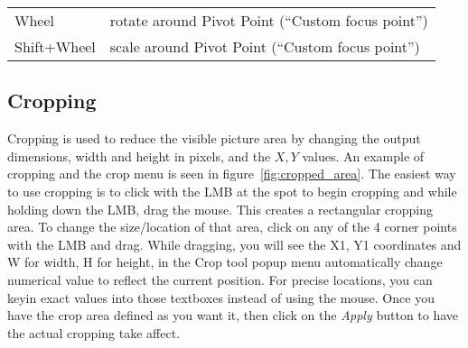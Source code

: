 \vspace{2ex}
\begin{tabular}{ll}
    \hline			
    Wheel & rotate around Pivot Point (“Custom focus point”) \\
    Shift+Wheel & scale around Pivot Point (“Custom focus point”) \\       
    \hline  
\end{tabular}

\vspace{2ex}

\subsection{Cropping}%
\label{sub:cropping}

Cropping is used to reduce the visible picture area by changing the output dimensions, width and
height in pixels, and the $X, Y$ values. An example of cropping and the crop menu is seen in
figure~\ref{fig:cropped_area}.
The easiest way to use cropping is to click with the LMB 
at the spot to begin cropping and while holding down the LMB, drag the mouse. This creates a rectangular
cropping area.  To change the size/location of that area, click on any of the 4 corner points
with the LMB and drag.  While dragging, you will see 
the X1, Y1 coordinates and W for width, H for height, in the Crop tool popup menu
automatically change numerical value to reflect the current position. For precise locations, you
can keyin exact values into those textboxes instead of using the mouse.
Once you have the crop area defined as you want it, then click on the \textit{Apply} button to have
the actual cropping take affect.

